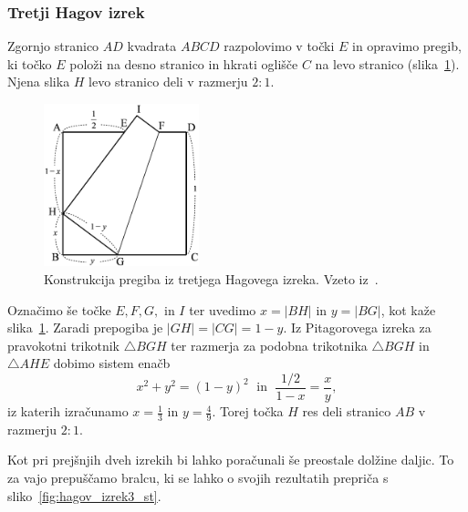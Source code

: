 \subsubsection{Tretji Hagov izrek}

\begin{izrek}
    Zgornjo stranico $AD$ kvadrata $ABCD$ razpolovimo v točki $E$ in opravimo pregib, ki točko $E$ položi na desno stranico in hkrati oglišče $C$ na levo stranico (slika~\ref{fig:hagov_izrek3}). Njena slika $H$ levo stranico deli v razmerju $2:1$.
\end{izrek}

\begin{figure}[h]
    \centering
    \includegraphics[width=0.4\textwidth]{images/hagovi_izreki/hagov_izrek3.png}
    \caption[Pregib iz tretjega Hagovega izreka]{Konstrukcija pregiba iz tretjega Hagovega izreka. Vzeto iz~\cite[str. 18]{haga2008}.}
    \label{fig:hagov_izrek3}
\end{figure}

\begin{dokaz}
    Označimo še točke $E, F, G,$ in $I$ ter uvedimo $x = |BH|$ in $y = |BG|$, kot kaže slika~\ref{fig:hagov_izrek3}. Zaradi prepogiba je $|GH| = |CG| = 1-y$. Iz Pitagorovega izreka za pravokotni trikotnik $\triangle BGH$ ter razmerja za podobna trikotnika $\triangle BGH$ in $\triangle AHE$ dobimo sistem enačb
    $$ x^2 + y^2 = (1-y)^2 \; \text{ in } \; \frac{1/2}{1-x} = \frac{x}{y}, $$
    iz katerih izračunamo $x = \frac{1}{3}$ in $y = \frac{4}{9}$. Torej točka $H$ res deli stranico $AB$ v razmerju $2:1$.
\end{dokaz}

Kot pri prejšnjih dveh izrekih bi lahko poračunali še preostale dolžine daljic. To za vajo prepuščamo bralcu, ki se lahko o svojih rezultatih prepriča s sliko~\ref{fig:hagov_izrek3_st}.

